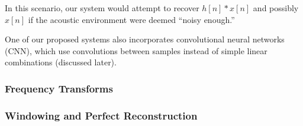In this scenario, our system would attempt to recover $h[n]*x[n]$ and possibly $x[n]$ if the acoustic environment were deemed ``noisy enough.''

One of our proposed systems also incorporates convolutional neural networks (CNN), which use convolutions between samples instead of simple linear combinations (discussed later).

\subsubsection{Frequency Transforms}



\subsubsection{Windowing and Perfect Reconstruction}
